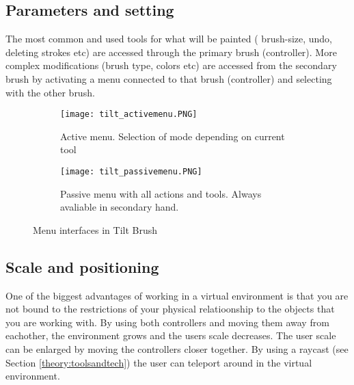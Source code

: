 \subsection{Parameters and setting}
The most common and used tools for what will be painted ( brush-size, undo, deleting strokes etc) are accessed through the primary brush (controller). More complex modifications (brush type, colors etc) are accessed from the secondary brush by activating a menu connected to that brush (controller) and selecting with the other brush.
\begin{figure}
\begin{subfigure}{.5\textwidth}
  \centering
  \texttt{[image: tilt\_activemenu.PNG]}
  \caption{Active menu. Selection of mode depending on current tool}
  \label{fig:sfig1:tilt_activemenu}
\end{subfigure}%
\begin{subfigure}{.5\textwidth}
  \centering
  \texttt{[image: tilt\_passivemenu.PNG]}
  \caption{Passive menu with all actions and tools. Always avaliable in secondary hand. }
  \label{fig:sfig2:tilt_activemenu}
\end{subfigure}
\caption{Menu interfaces in Tilt Brush}
\label{fig:fig:tilt_menu}
\end{figure}
\subsection{Scale and positioning}
One of the biggest advantages of working in a virtual environment is that you are not bound to the restrictions of your physical relatioonship to the objects that you are working with. By using both controllers and moving them away from eachother, the environment grows and the users scale decreases. The user scale can be enlarged by moving the controllers closer together.
By using a raycast (see Section \ref{theory:toolsandtech}) the user can teleport around in the virtual environment.
